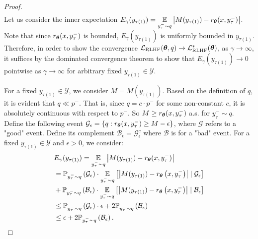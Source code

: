 \begin{proof}
\begin{equation*}
\begin{aligned}
\end{aligned}
\end{equation*}
Let us consider the inner expectation $E_{\gamma}(y_{\tau\left(1\right)}) = \operatorname*{\mathbb{E}}\limits_{y^{-}_{\tau}\sim q}\left|M(y_{\tau\left(1\right)})-r_{{\boldsymbol{\theta}}}(x,y^{-}_{\tau})\right|$. Note that since $r_{{\boldsymbol{\theta}}}(x,y^{-}_{\tau})$ is bounded, $E_{\gamma}(y_{\tau\left(1\right)})$ is uniformly bounded in $y_{\tau\left(1\right)}$. Therefore, in order to show the convergence $\mathcal{L}_{\text{RLHF}}({\boldsymbol{\theta}},q)\rightarrow\mathcal{L}_{\text{RLHF}}^{*}({\boldsymbol{\theta}})$, as $\gamma\rightarrow\infty$, it suffices by the dominated convergence theorem to show that $E_{\gamma}(y_{\tau\left(1\right)})\rightarrow 0$ pointwise as $\gamma\rightarrow\infty$ for arbitrary fixed $y_{\tau\left(1\right)}\in \mathcal{Y}$.

For a fixed $y_{\tau\left(1\right)}\in\mathcal{Y}$, we consider $M=M(y_{\tau\left(1\right)})$. Based on the definition of $q$, it is evident that $q \ll p^{-}$. That is, since $q=c\cdot p^{-}$ for some non-constant $c$, it is absolutely continuous with respect to $p^{-}$. So $M\geq r_{{\boldsymbol{\theta}}}(x,y^{-}_{\tau})$ a.s. for $y^{-}_{\tau}\sim q$. Define the following event $\mathcal{G}_{\epsilon}=\{q:r_{{\boldsymbol{\theta}}}(x,y^{-}_{\tau})\geq M-\epsilon\}$, where $\mathcal{G}$ refers to a "good" event. Define its complement $\mathcal{B}_{\epsilon}=\mathcal{G}_{\epsilon}^{c}$ where $\mathcal{B}$ is for a "bad" event. For a fixed $y_{\tau\left(1\right)}\in\mathcal{Y}$ and $\epsilon>0$, we consider:
\begin{equation*}
\begin{aligned}
& E_{\gamma}(y_{\tau\left(1\right)}) = \expectation\limits_{y^{-}_{\tau}\sim q}\left|M(y_{\tau\left(1\right)})-r_{\wm}(x,y^{-}_{\tau})\right| \\
&=\mathbb{P}_{y^{-}_{\tau}\sim q}\left(\mathcal{G}_{\epsilon}\right)\cdot\expectation_{y^{-}_{\tau}\sim q}\left[\left|M(y_{\tau\left(1\right)})-r_{\wm}\left(x,y^{-}_{\tau}\right)\right|\mid\mathcal{G}_{\epsilon}\right] \\
&+
\mathbb{P}_{y^{-}_{\tau}\sim q}\left(\mathcal{B}_{\epsilon}\right)\cdot\expectation_{y^{-}_{\tau}\sim q}\left[\left|M(y_{\tau\left(1\right)})-r_{\wm}\left(x,y^{-}_{\tau}\right)\right|\mid\mathcal{B}_{\epsilon}\right] \\
&\leq \mathbb{P}_{y^{-}_{\tau}\sim q}\left(\mathcal{G}_{\epsilon}\right)\cdot \epsilon +2\mathbb{P}_{y^{-}_{\tau}\sim q}\left(\mathcal{B}_{\epsilon}\right) \\
&\leq \epsilon+2\mathbb{P}_{y^{-}_{\tau}\sim q}\left(\mathcal{B}_{\epsilon}\right).

\end{aligned}
\end{equation*}
\end{proof}
